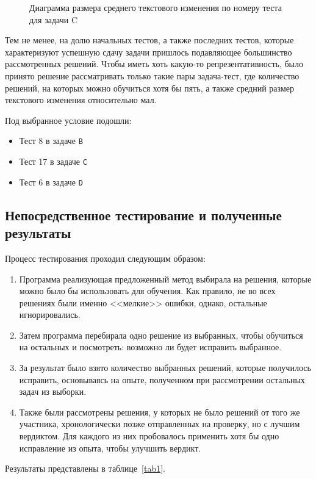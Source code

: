 \begin{figure}[!h] 
\caption{Диаграмма размера среднего текстового изменения по номеру теста для задачи C}\label{fig3} 
\centering
{}

\end{figure}

Тем не менее, на долю начальных тестов, а также последних тестов, которые характеризуют успешную сдачу задачи пришлось подавляющее
большинство рассмотренных решений. Чтобы иметь хоть какую-то репрезентативность, было принято решение рассматривать только такие пары
задача-тест, где количество решений, на которых можно обучиться хотя бы пять, а также средний размер текстового изменения относительно
мал.

Под выбранное условие подошли:
\begin{itemize}
    \item Тест 8 в задаче \texttt{B}
    \item Тест 17 в задаче \texttt{C}
    \item Тест 6 в задаче \texttt{D}
\end{itemize}

\subsection{Непосредственное тестирование и полученные результаты}

Процесс тестирования проходил следующим образом:
\begin{enumerate}
\item Программа реализующая предложенный метод выбирала на решения, которые можно было бы использовать для обучения.
    Как правило, не во всех решениях были именно <<мелкие>> ошибки, однако, остальные игнорировались.
\item Затем программа перебирала одно решение из выбранных, чтобы обучиться на остальных и посмотреть: возможно ли будет
    исправить выбранное.
\item За результат было взято количество выбранных решений, которые получилось исправить, основываясь на опыте, полученном
    при рассмотрении остальных задач из выборки.
\item Также были рассмотрены решения, у которых не было решений от того же участника, хронологически
    позже отправленных на проверку, но с лучшим вердиктом. Для каждого из них пробовалось применить хотя бы одно исправление из опыта,
    чтобы улучшить вердикт.  
\end{enumerate}
Результаты представлены в таблице~\ref{tab1}.


